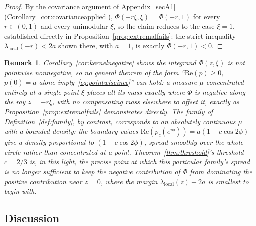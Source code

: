 \documentclass[pdflatex,sn-mathphys-num]{sn-jnl}%
\theoremstyle{thmstyleone}%
\theoremstyle{thmstyletwo}%
\newtheorem{remark}{Remark}%
\theoremstyle{thmstylethree}%
\begin{document}
\begin{proof}
By the covariance argument of Appendix~\ref{secA1} (Corollary~\ref{cor:covarianceapplied}), $\Phi(-r\xi,\xi)=\Phi(-r,1)$ for every $r\in(0,1)$ and every unimodular $\xi$, so the claim reduces to the case $\xi=1$, established directly in Proposition~\ref{prop:extremalfails}: the strict inequality $\lambda_{\mathrm{local}}(-r)<2a$ shown there, with $a=1$, is exactly $\Phi(-r,1)<0$.
\end{proof}

\begin{remark}
\label{rem:concentration}
Corollary~\ref{cor:kernelnegative} shows the integrand $\Phi(z,\xi)$ is not pointwise nonnegative, so no general theorem of the form ``$\mathrm{Re}(p)\ge0$, $p(0)=a$ alone imply~\eqref{eq:pointwiseineq}'' can hold: a measure $\mu$ concentrated entirely at a single point $\xi$ places all its mass exactly where $\Phi$ is negative along the ray $z=-r\xi$, with no compensating mass elsewhere to offset it, exactly as Proposition~\ref{prop:extremalfails} demonstrates directly. The family of Definition~\ref{def:family}, by contrast, corresponds to an absolutely continuous $\mu$ with a bounded density: the boundary values $\mathrm{Re}(p_c(e^{i\phi}))=a(1-c\cos2\phi)$ give a density proportional to $(1-c\cos2\phi)$, spread smoothly over the whole circle rather than concentrated at a point. Theorem~\ref{thm:threshold}'s threshold $c=2/3$ is, in this light, the precise point at which this particular family's spread is no longer sufficient to keep the negative contribution of $\Phi$ from dominating the positive contribution near $z=0$, where the margin $\lambda_{\mathrm{local}}(z)-2a$ is smallest to begin with.
\end{remark}

\subsection{Discussion}
\end{document}
